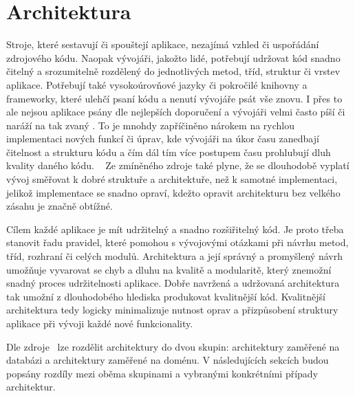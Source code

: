 \section{Architektura}

Stroje,
které sestavují či spouštejí aplikace,
nezajímá vzhled či uspořádání zdrojového kódu.
Naopak vývojáři,
jakožto lidé,
potřebují udržovat kód snadno čitelný a srozumitelně rozdělený do jednotlivých
metod, tříd, struktur či vrstev aplikace.
Potřebují také vysokoúrovňové jazyky či pokročilé knihovny a frameworky,
které ulehčí psaní kódu a nenutí vývojáře psát vše znovu.
I přes to ale nejsou aplikace psány dle nejlepších doporučení
a vývojáři velmi často píší či naráží na tak zvaný .
To je mnohdy zapříčiněno nárokem na rychlou implementaci nových funkcí či úprav,
kde vývojáři na úkor času zanedbají čitelnost a strukturu kódu
a čím dál tím více postupem času prohlubují dluh kvality daného kódu.
\cite{architecture}
~\cite[kapitola~15]{martin_clean_architecture}
Ze zmíněného zdroje také plyne,
že se dlouhodobě vyplatí vývoj směřovat k dobré struktuře a architektuře,
než k samotné implementaci,
jelikož implementace se snadno opraví,
kdežto opravit architekturu bez velkého zásahu je značně obtížné.
\cite{martin_clean_architecture}

Cílem každé aplikace je mít udržitelný a snadno rozšiřitelný kód.
Je proto třeba stanovit řadu pravidel,
které pomohou s vývojovými otázkami při návrhu metod, tříd, rozhraní či
celých modulů.
Architektura a její správný a promyšlený návrh umožňuje vyvarovat
se chyb a dluhu na kvalitě a modularitě,
který znemožní snadný proces udržitelnosti aplikace.
\cite[kapitola~15]{martin_clean_architecture}
Dobře navržená a udržovaná architektura tak umožní z dlouhodobého hlediska
produkovat kvalitnější kód.
Kvalitnější architektura tedy logicky minimalizuje nutnost oprav a
přizpůsobení struktury aplikace při vývoji každé nové funkcionality.

Dle zdroje~\cite{architecture} lze rozdělit architektury do dvou skupin:
architektury zaměřené na databázi a architektury zaměřené na doménu.
V následujících sekcích budou popsány rozdíly mezi oběma skupinami
a vybranými konkrétními případy architektur.

